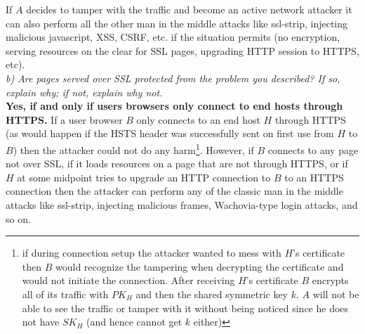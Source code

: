 If $A$ decides to tamper with the traffic and become an active network attacker it can also perform all the other man in the middle attacks like ssl-strip, injecting malicious javascript, XSS, CSRF, etc. if the situation permits (no encryption, serving resources on the clear for SSL pages, upgrading HTTP session to HTTPS, etc).\\

\noindent \textit{b) Are pages served over SSL protected from the problem you described? If so, explain why; if not, explain why not.}\\

\textbf{Yes, if and only if users browsers only connect to end hosts through HTTPS.} If a user browser $B$ only connects to an end host $H$ through HTTPS (as would happen if the HSTS header was successfully sent on first use from $H$ to $B$) then the attacker could not do any harm\footnote{if during connection setup the attacker wanted to mess with $H$'s certificate then $B$ would recognize the tampering when decrypting the certificate and would not initiate the connection. After receiving $H$'s certificate $B$ encrypts all of its traffic with $PK_H$ and then the shared symmetric key $k$. $A$ will not be able to see the traffic or tamper with it without being noticed since he does not have $SK_H$ (and hence cannot get $k$ either)}.  However, if $B$ connects to any page not over SSL, if it loads resources on a page that are not through HTTPS, or if $H$ at some midpoint tries to upgrade an HTTP connection to $B$ to an HTTPS connection then the attacker can perform any of the classic man in the middle attacks like ssl-strip, injecting malicious frames, Wachovia-type login attacks, and so on.